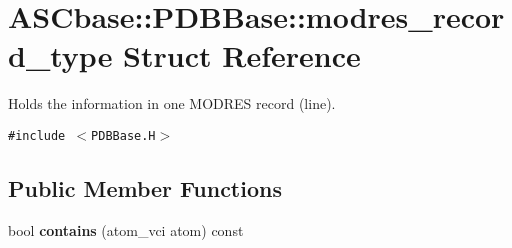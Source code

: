 \section{ASCbase::PDBBase::modres\_\-record\_\-type Struct Reference}
\label{structASCbase_1_1PDBBase_1_1modres__record__type}
Holds the information in one MODRES record (line).  


{\tt \#include $<$PDBBase.H$>$}

\subsection*{Public Member Functions}
\begin{CompactItemize}
\item 
bool \textbf{contains} (atom\_\-vci atom) const \label{structASCbase_1_1PDBBase_1_1modres__record__type_8ec38a410ab4be9f8eb84a219628efb3}

\end{CompactItemize}
